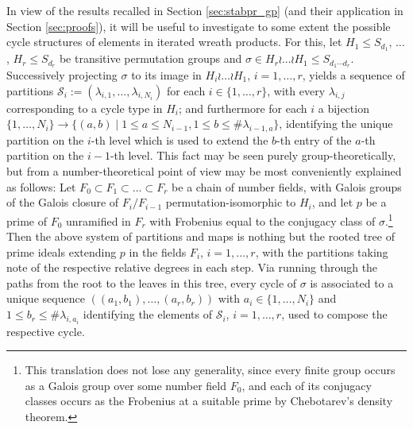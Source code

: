 \documentclass[a4paper]{amsart}
\begin{document}

In view of the results recalled in Section \ref{sec:stabpr_gp} (and their application in Section \ref{sec:proofs}), it will be useful to investigate to some extent the possible cycle structures of elements in iterated wreath products. For this, let $H_1\le S_{d_1}$, $\dots$, $H_r\le S_{d_r}$ be transitive permutation groups and $\sigma\in H_r\wr\dots\wr H_{1}\le S_{d_1\cdots d_r}$. Successively projecting $\sigma$ to its image in $H_i\wr\dots\wr H_1$, $i=1,\dots, r$, yields a sequence of partitions $\mathcal{S}_i:=(\lambda_{i,1},\dots, \lambda_{i,N_i})$ for each $i\in \{1,\dots, r\}$, with every $\lambda_{i,j}$ corresponding to a cycle type in $H_i$; 
and furthermore for each $i$ a bijection $\{1,\dots, N_i\}\to \{(a,b)\mid 1\le a\le N_{i-1}, 1\le b\le \#\lambda_{i-1,a}\}$, identifying the unique partition on the $i$-th level which is used to extend the $b$-th entry of the $a$-th partition on the $i-1$-th level.
This fact may be seen purely group-theoretically, but from a number-theoretical point of view may be most conveniently explained as follows: Let $F_0\subset F_1\subset\dots\subset F_r$ be a chain of number fields, with Galois groups of the Galois closure of $F_i/F_{i-1}$ permutation-isomorphic to $H_i$, and let $p$ be a prime of $F_0$ unramified in $F_r$ with Frobenius equal to the conjugacy class of $\sigma$.\footnote{This translation does not lose any generality, since every finite group occurs as a Galois group over some number field $F_0$, and each of its conjugacy classes occurs as the Frobenius at a suitable prime by Chebotarev's density theorem.}
Then the above system of partitions and maps is nothing but the rooted tree of prime ideals extending $p$ in the fields $F_i$, $i=1,\dots, r$, with the partitions taking note of the respective relative degrees in each step. Via running through the paths from the root to the leaves in this tree, every cycle of $\sigma$ is associated to a unique sequence $((a_1,b_1),\dots, (a_r,b_r))$ with $a_i\in \{1,\dots, N_i\}$ and $1\le b_r\le \#\lambda_{i,a_i}$ identifying the elements of $\mathcal{S}_i$, $i=1,\dots, r$, used to compose the respective cycle.
 
\end{document}

